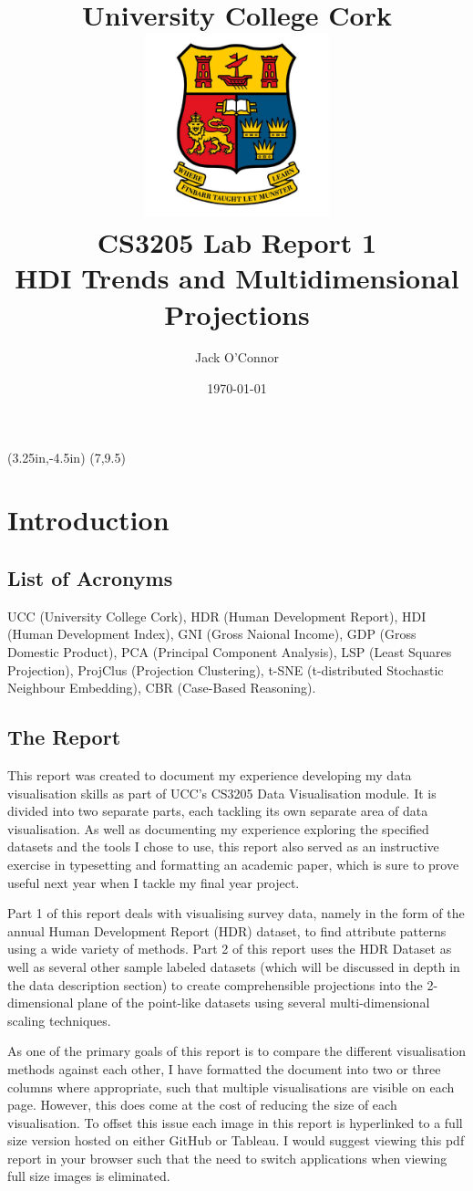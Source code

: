 \documentclass[11pt,a4paper,final]{article}
\title{ \vspace{3.5cm}
	University College Cork \\ [1cm]
	\includegraphics[width=0.4\textwidth]{ucc_crest} \\ [1cm]
	CS3205 Lab Report 1 \\ [0.5cm]
	HDI Trends and Multidimensional Projections
}
\author{Jack O'Connor}
\date{\today}
\begin{document}
\thisfancyput(3.25in,-4.5in){%
  \setlength{\unitlength}{1in}\fancyoval(7,9.5)}%
\maketitle
\pagebreak
{
\hypersetup{hidelinks}
\tableofcontents
}
\pagebreak
\setcounter{page}{1}


\section{Introduction}
\subsection{List of Acronyms}
UCC (University College Cork), HDR (Human Development Report), HDI (Human Development Index), GNI (Gross Naional Income), GDP (Gross Domestic Product), PCA (Principal Component Analysis), LSP (Least Squares Projection), ProjClus (Projection Clustering), t-SNE (t-distributed Stochastic Neighbour Embedding), CBR (Case-Based Reasoning).

\subsection{The Report}
This report was created to document my experience developing my data visualisation skills as part of UCC's CS3205 Data Visualisation module. It is divided into two separate parts, each tackling its own separate area of data visualisation. As well as documenting my experience exploring the specified datasets and the tools I chose to use, this report also served as an instructive exercise in typesetting and formatting an academic paper, which is sure to prove useful next year when I tackle my final year project.

Part 1 of this report deals with visualising survey data, namely in the form of the annual Human Development Report (HDR) dataset, to find attribute patterns using a wide variety of methods. Part 2 of this report uses the HDR Dataset as well as several other sample labeled datasets (which will be discussed in depth in the data description section) to create comprehensible projections into the 2-dimensional plane of the point-like datasets using several multi-dimensional scaling techniques.

As one of the primary goals of this report is to compare the different visualisation methods against each other, I have formatted the document into two or three columns where appropriate, such that multiple visualisations are visible on each page. However, this does come at the cost of reducing the size of each visualisation. To offset this issue each image in this report is hyperlinked to a full size version hosted on either GitHub or Tableau. I would suggest viewing this pdf report in your browser such that the need to switch applications when viewing full size images is eliminated.
\end{document}
